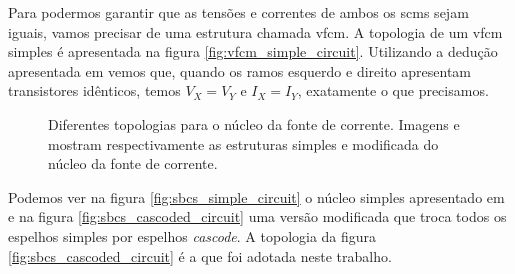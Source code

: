 \documentclass[10pt,a4paper]{extreport}
\newcommand{\?}{\stackrel{?}{=}}
\begin{document}
Para podermos garantir que as tensões e correntes de ambos os \acrshort{scm}s sejam iguais, vamos precisar de uma estrutura chamada \acrfull{vfcm}. A topologia de um \acrshort{vfcm} simples é apresentada na figura \ref{fig:vfcm_simple_circuit}. Utilizando a dedução apresentada em \cite{sbcs} vemos que, quando os ramos esquerdo e direito apresentam transistores idênticos, temos $V_X=V_Y$ e $I_X=I_Y$, exatamente o que precisamos.

\begin{figure}[htp!]
    \centering
    \hspace{1.5cm}
    \caption[Diferentes topologias para o núcleo da fonte de corrente.]{Diferentes topologias para o núcleo da fonte de corrente. Imagens  e  mostram respectivamente as estruturas simples e modificada do núcleo da fonte de corrente.}
    \label{fig:core_topology}
\end{figure}

Podemos ver na figura \ref{fig:sbcs_simple_circuit} o núcleo simples apresentado em \cite{sbcs} e na figura \ref{fig:sbcs_cascoded_circuit} uma versão modificada que troca todos os espelhos simples por espelhos \textit{cascode}. A topologia da figura \ref{fig:sbcs_cascoded_circuit} é a que foi adotada neste trabalho.
\end{document}
